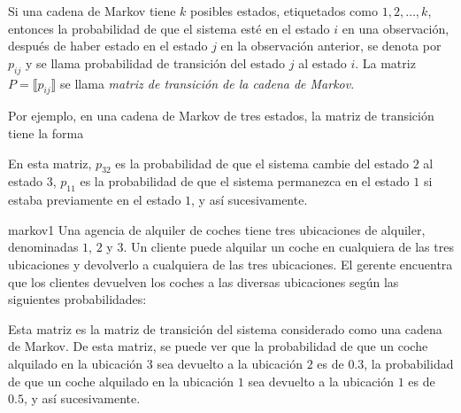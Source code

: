 \newpage

\begin{definicion}{}{}
    Si una cadena de Markov tiene $k$ posibles estados, etiquetados como $1, 2, \ldots, k$, entonces la probabilidad de que el sistema esté en el estado $i$ en una observación, después de haber estado en el estado $j$ en la observación anterior, se denota por $p_{ij}$ y se llama probabilidad de transición del estado $j$ al estado $i$. La matriz $P = \lBrack p_{ij} \rBrack$ se llama \emph{matriz de transición de la cadena de Markov}.
\end{definicion}

Por ejemplo, en una cadena de Markov de tres estados, la matriz de transición tiene la forma
\begin{nscenter}
\end{nscenter}
En esta matriz, $p_{32}$ es la probabilidad de que el sistema cambie del estado $2$ al estado $3$, $p_{11}$ es la probabilidad de que el sistema permanezca en el estado $1$ si estaba previamente en el estado $1$, y así sucesivamente.

\begin{examplebox}{}{markov1}
    Una agencia de alquiler de coches tiene tres ubicaciones de alquiler, denominadas $1$, $2$ y $3$. Un cliente puede alquilar un coche en cualquiera de las tres ubicaciones y devolverlo a cualquiera de las tres ubicaciones. El gerente encuentra que los clientes devuelven los coches a las diversas ubicaciones según las siguientes probabilidades:
    \begin{nscenter}
    \end{nscenter}
    Esta matriz es la matriz de transición del sistema considerado como una cadena de Markov. De esta matriz, se puede ver que la probabilidad de que un coche alquilado en la ubicación $3$ sea devuelto a la ubicación $2$ es de $0.3$, la probabilidad de que un coche alquilado en la ubicación $1$ sea devuelto a la ubicación $1$ es de $0.5$, y así sucesivamente.
\end{examplebox}

